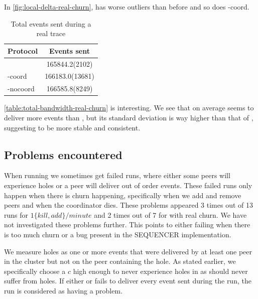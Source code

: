 In \autoref{fig:local-delta-real-churn}, \epto has worse outliers than before and so does \jgroups-coord.
\begin{table}[hpt]
	\centering
	\caption{Total events sent during a real trace}
\begin{tabular}{lS}
	\toprule
	Protocol & {Events sent}\\
	\midrule
	\epto & 165844.2(2102)\\
	\jgroups-coord & 166183.0(13681)\\
	\jgroups-nocoord & 166585.8(8249)\\
	\bottomrule
\end{tabular}
    \label{table:total-sent-real-churn}
\end{table}
\autoref{table:total-bandwidth-real-churn} is interesting. We see that on average \jgroups seems to deliver more events than \epto, but its standard deviation is way higher than that of \epto, suggesting \epto to be more stable and consistent.
\subsection{Problems encountered}
When running \jgroups we sometimes get failed runs, where either some peers will experience holes or a peer will deliver out of order events. These failed runs only happen when there is churn happening, specifically when we add and remove peers and when the coordinator dies. These problems appeared 3 times out of 13 runs for \jgroups $1\{kill,add\}/minute$ and 2 times out of 7 for \jgroups with real churn. We have not investigated these problems further. This points to either \jgroups failing when there is too much churn or a bug present in the SEQUENCER implementation.

We measure holes as one or more events that were delivered by at least one peer in the cluster but not on the peer containing the hole. As stated earlier, we specifically choose a $c$ high enough to never experience holes in \epto as \jgroups should never suffer from holes. If either \jgroups or \epto fails to deliver every event sent during the run, the run is considered as having a problem.
